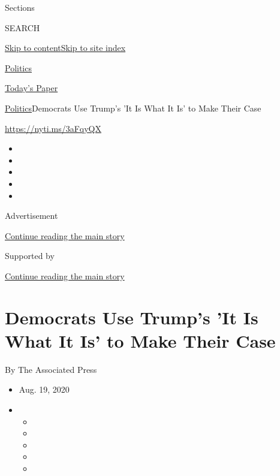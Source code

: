 Sections

SEARCH

\protect\hyperlink{site-content}{Skip to
content}\protect\hyperlink{site-index}{Skip to site index}

\href{https://www.nytimes3xbfgragh.onion/section/politics}{Politics}

\href{https://myaccount.nytimes3xbfgragh.onion/auth/login?response_type=cookie\&client_id=vi}{}

\href{https://www.nytimes3xbfgragh.onion/section/todayspaper}{Today's
Paper}

\href{/section/politics}{Politics}\textbar{}Democrats Use Trump's 'It Is
What It Is' to Make Their Case

\url{https://nyti.ms/3aFqyQX}

\begin{itemize}
\item
\item
\item
\item
\item
\end{itemize}

Advertisement

\protect\hyperlink{after-top}{Continue reading the main story}

Supported by

\protect\hyperlink{after-sponsor}{Continue reading the main story}

\hypertarget{democrats-use-trumps-it-is-what-it-is-to-make-their-case}{%
\section{Democrats Use Trump's 'It Is What It Is' to Make Their
Case}\label{democrats-use-trumps-it-is-what-it-is-to-make-their-case}}

By The Associated Press

\begin{itemize}
\item
  Aug. 19, 2020
\item
  \begin{itemize}
  \item
  \item
  \item
  \item
  \item
  \end{itemize}
\end{itemize}

